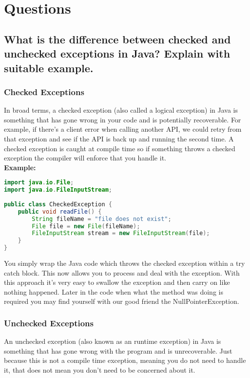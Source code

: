 \documentclass[11pt]{article}
\begin{document}
\thispagestyle{empty}
\clearpage


\setcounter{page}{1}
\section{Questions}

\subsection{\textbf{What is the difference between checked and unchecked exceptions in Java? Explain with suitable example. }}

\subsubsection{Checked Exceptions}
In broad terms, a checked exception (also called a logical exception) in Java is something that has gone wrong in your code and is potentially recoverable. For example, if there’s a client error when calling another API, we could retry from that exception and see if the API is back up and running the second time. A checked exception is caught at compile time so if something throws a checked exception the compiler will enforce that you handle it.\\

\textbf{Example:}
\begin{lstlisting}[language=Java]
import java.io.File;
import java.io.FileInputStream;
	
public class CheckedException { 
	public void readFile() {
		String fileName = "file does not exist";
		File file = new File(fileName);
		FileInputStream stream = new FileInputStream(file);
	}
}	
\end{lstlisting}

You simply wrap the Java code which throws the checked exception within a try catch block. This now allows you to process and deal with the exception. With this approach it's very easy to swallow the exception and then carry on like nothing happened. Later in the code when what the method was doing is required you may find yourself with our good friend the NullPointerException.

\subsubsection{Unchecked Exceptions}
An unchecked exception (also known as an runtime exception) in Java is something that has gone wrong with the program and is unrecoverable. Just because this is not a compile time exception, meaning you do not need to handle it, that does not mean you don’t need to be concerned about it.\\
\end{document}
